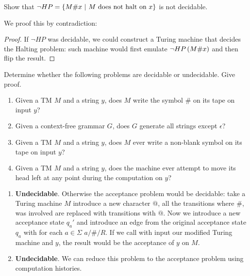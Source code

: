 \documentclass{article}
\begin{document}
\begin{exercise}
Show that $\neg HP=\left\{ M \#x\ |\ \mbox{$M$ does not halt on $x$} \right\}$ is not decidable.
\begin{answer}
We proof this by contradiction:
\begin{proof}
If $\neg HP$ was decidable, we could construct a Turing machine that decides the Halting problem: such machine would first emulate $\neg HP\left( M\#x \right)$ and then flip the result.
\end{proof}
\end{answer}
\end{exercise}

\begin{exercise}
Determine whether the following problems are decidable or undecidable. Give proof.
\begin{enumerate}
 \item Given a TM $M$ and a string $y$, does $M$ write the symbol $\#$ on its tape on input $y$?
 \item Given a context-free grammar $G$, does $G$ generate all strings except $\epsilon$?
 \item Given a TM $M$ and a string $y$, does $M$ ever write a non-blank symbol on its tape on input $y$?
 \item Given a TM $M$ and a string $y$, does the machine ever attempt to move its head left at any point during the computation on $y$?
\end{enumerate}
\begin{answer}
\begin{enumerate}
 \item \textbf{Undecidable}. Otherwise the acceptance problem would be decidable: take a Turing machine $M$ introduce a new character $@$, all the transitions where $\#$, was involved are replaced with transitions with $@$. Now we introduce a new acceptance state $q_a'$ and introduce an edge from the original acceptance state $q_a$ with for each $a\in\Sigma$ $a/\#/R$. If we call with input our modified Turing machine and $y$, the result would be the acceptance of $y$ on $M$.
 \item \textbf{Undecidable}. We can reduce this problem to the acceptance problem using computation histories.

\end{enumerate}
\end{answer}
\end{exercise}
\end{document}
